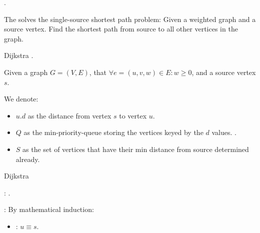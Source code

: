
  \par {}.


    \par The  solves the single-source shortest path
      problem: Given a weighted graph and a source vertex. Find the shortest
      path from source to all other vertices in the graph.

    \par Dijkstra .

    \par Given a graph $G = (V, E)$, that $\forall e = (u, v, w) \in E: w \geq
    0$, and a source vertex $s$.
    \par We denote:
    \begin{itemize}
      \item $u.d$ as the distance from vertex $s$ to vertex $u$.
      \item $Q$ as the min-priority-queue storing the vertices keyed by the
        $d$ values. .
      \item $S$ as the set of vertices that have their min distance from source
        determined already.
    \end{itemize}

    \begin{algorithm}[H]
      \caption{Dijkstra}
      \begin{algorithmic}[1]
          \EndFor
          \State{}
              \State{}
            \EndFor
          \EndWhile
        \EndFunction

        \State

            \State{}
          \EndIf
        \EndFunction
      \end{algorithmic}
    \end{algorithm}

    \par {}: .
    \par {}: By mathematical induction:
    \begin{itemize}
      \item {}: $u \equiv s$.
    \end{itemize}

    
